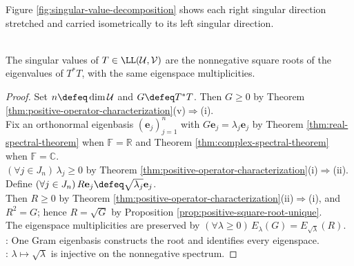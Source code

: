 Figure \ref{fig:singular-value-decomposition} shows each right singular direction stretched and carried isometrically to its left singular direction.

\begin{illustrationfigure}[H]
  \centering
  
  \caption{Since $T=S\sqrt{T^*T}$, each $\mathbf{e}_j$ maps to $s_j\mathbf{f}_j$.}
  \label{fig:singular-value-decomposition}
\end{illustrationfigure}

\begin{proposition} \label{prop:singular-values-from-t-star-t} \\
The singular values of $T\in\LL(\mathcal{U},\mathcal{V})$ are the nonnegative square roots of the eigenvalues of $T^*T$, with the same eigenspace multiplicities.
\begin{proof}
Set $n\defeq\dim\mathcal{U}$ and $G\defeq T^*T$. Then $G\geq0$ by Theorem \ref{thm:positive-operator-characterization}(v)$\Rightarrow$(i).\\
Fix an orthonormal eigenbasis $(\mathbf{e}_j)_{j=1}^{n}$ with $G\mathbf{e}_j=\lambda_j\mathbf{e}_j$ by Theorem \ref{thm:real-spectral-theorem} when $\mathbb{F}=\mathbb{R}$ and Theorem \ref{thm:complex-spectral-theorem} when $\mathbb{F}=\mathbb{C}$.\\
$(\forall j\in J_n)\,\lambda_j\geq0$ by Theorem \ref{thm:positive-operator-characterization}(i)$\Rightarrow$(ii). Define $(\forall j\in J_n)\,R\mathbf{e}_j\defeq\sqrt{\lambda_j}\mathbf{e}_j$.\\
Then $R\geq0$ by Theorem \ref{thm:positive-operator-characterization}(ii)$\Rightarrow$(i), and $R^2=G$; hence $R=\sqrt{G}$ by Proposition \ref{prop:positive-square-root-unique}.\\
The eigenspace multiplicities are preserved by $(\forall\lambda\geq0)\,E_{\lambda}(G)=E_{\sqrt{\lambda}}(R)$.\\
: One Gram eigenbasis constructs the root and identifies every eigenspace.\\
: $\lambda\mapsto\sqrt{\lambda}$ is injective on the nonnegative spectrum.
\end{proof}
\end{proposition}

